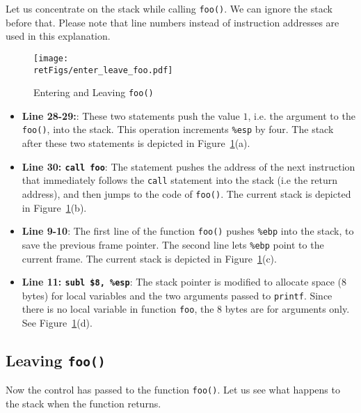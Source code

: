 Let us concentrate on the stack while calling {\tt foo()}. We can ignore the stack
before that. Please note that line numbers instead of instruction addresses are
used in this explanation. 



\begin{figure}[htb]
	\centering
	\texttt{[image: \\retFigs/enter\_leave\_foo.pdf]}
	\caption{Entering and Leaving {\tt foo()}}
	\label{fig:enter_leave_foo}
\end{figure}


\begin{itemize}
\item \textbf{Line 28-29:}:
These two statements push the value $1$, i.e. the argument to the {\tt foo()}, 
into the stack. This operation increments {\tt \%esp} by four. The stack
after these two statements is depicted in Figure~\ref{fig:enter_leave_foo}(a).

\item \textbf{Line 30: \texttt{call foo}}: 
The statement pushes the address of the next instruction that 
immediately follows the {\tt call} statement into the 
stack (i.e the return address), and then jumps to the 
code of {\tt foo()}. 
The current stack is depicted in Figure~\ref{fig:enter_leave_foo}(b).

\item \textbf{Line 9-10}:
The first line of the function {\tt foo()} pushes {\tt \%ebp} into
the stack, to save the previous frame pointer. The second
line lets {\tt \%ebp} point to the current frame. The current stack 
is depicted in Figure~\ref{fig:enter_leave_foo}(c). 

\item \textbf{Line 11: \texttt{subl \$8, \%esp}}:
The stack pointer is modified to allocate space (8 bytes) for 
local variables and the two arguments passed to {\tt printf}. 
Since there is no local variable in function {\tt foo}, the
8 bytes are for arguments only. 
See Figure~\ref{fig:enter_leave_foo}(d). 

\end{itemize}


\subsection{Leaving {\tt foo()}}

Now the control has passed to the function {\tt foo()}. Let us see what happens
to the stack when the function returns.

